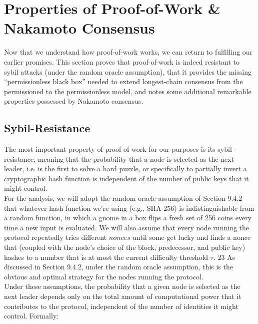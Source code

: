 \section{Properties of Proof-of-Work & Nakamoto Consensus}
Now that we understand how proof-of-work works, we can return to fulfilling our earlier
promises. This section proves that proof-of-work is indeed resistant to sybil attacks (under
the random oracle assumption), that it provides the missing “permissionless black box”
needed to extend longest-chain consensus from the permissioned to the permissionless model,
and notes some additional remarkable properties possessed by Nakamoto consensus.
\subsection{Sybil-Resistance}
The most important property of proof-of-work for our purposes is its sybil-resistance, meaning
that the probability that a node is selected as the next leader, i.e. is the first to solve a
hard puzzle, or specifically to partially invert a cryptographic hash function is independent
of the number of public keys that it might control.\\
For the analysis, we will adopt the random oracle assumption of Section 9.4.2—that whatever hash function we’re using (e.g., SHA-256) is indistinguishable from a random function,
in which a gnome in a box flips a fresh set of 256 coins every time a new input is evaluated. We will also assume that every node running the protocol repeatedly tries different
$nonces$ until some get lucky and finds a nonce that (coupled with the node’s choice of the block,
predecessor, and public key) hashes to a number that is at most the current difficulty threshold $\tau$.
23 As discussed in Section 9.4.2, under the random oracle assumption, this is the obvious
and optimal strategy for the nodes running the protocol.\\
Under these assumptions, the probability that a given node is selected as the next leader
depends only on the total amount of computational power that it contributes to the protocol,
independent of the number of identities it might control. Formally:\\

